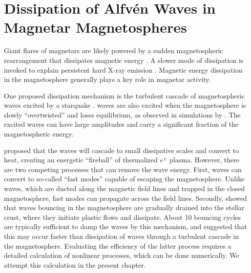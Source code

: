 
\chapter[Dissipation of Alfv\'{e}n Waves in Magnetar Magnetospheres]{Dissipation of Alfv\'{e}n Waves in Magnetar Magnetospheres}
\label{chap:magnetosphere-dissipation}

Giant flares of magnetars are likely powered by a sudden magnetospheric rearrangement that dissipates magnetic energy \citep{1995MNRAS.275..255T,1996ApJ...473..322T,2001ApJ...561..980T}.
A slower mode of dissipation is invoked to explain persistent hard X-ray emission \citep{2013ApJ...762...13B}.
Magnetic energy dissipation in the magnetosphere generally plays a key role in magnetar activity.

One proposed dissipation mechanism is the turbulent cascade of magnetospheric \alfven waves excited by a starquake \citep{1996ApJ...473..322T}. \alfven waves are also excited when the magnetosphere is slowly ``overtwisted'' and loses equilibrium, as observed in simulations by \citep{2013ApJ...774...92P}. The excited waves can have large amplitudes and carry a significant fraction of the magnetospheric energy. 

\citet{1996ApJ...473..322T,2001ApJ...561..980T} proposed that the waves will cascade to small dissipative scales and convert to heat, creating an energetic ``fireball'' of thermalized $e^\pm$ plasma. However, there are two competing processes that can remove the wave energy. First, \alfven waves can convert to so-called ``fast modes'' capable of escaping the magnetosphere. Unlike \alfven waves, which are ducted along the magnetic field lines and trapped in the closed magnetosphere, fast modes can propagate across the field lines.
Secondly, \citet{2015ApJ...815...25L} showed that \alfven waves bouncing in the magnetosphere are gradually drained into the stellar crust, where they initiate plastic flows and dissipate. About 10 bouncing cycles are typically sufficient to damp the waves by this mechanism, and \citet{2015ApJ...815...25L} suggested that this may occur faster than dissipation of waves through a turbulent cascade in the magnetosphere. Evaluating the efficiency of the latter process requires a detailed calculation of nonlinear processes, which can be done numerically. We attempt this calculation in the present chapter.

